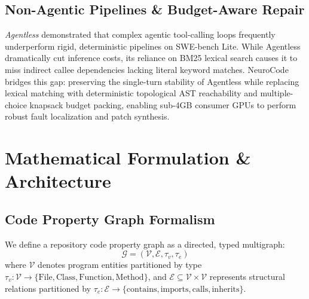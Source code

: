 \documentclass[conference]{IEEEtran}
\begin{document}
\subsection{Non-Agentic Pipelines \& Budget-Aware Repair}
\textit{Agentless} \cite{agentless} demonstrated that complex agentic tool-calling loops frequently underperform rigid, deterministic pipelines on SWE-bench Lite. While Agentless dramatically cut inference costs, its reliance on BM25 lexical search causes it to miss indirect callee dependencies lacking literal keyword matches. NeuroCode bridges this gap: preserving the single-turn stability of Agentless while replacing lexical matching with deterministic topological AST reachability and multiple-choice knapsack budget packing, enabling sub-4GB consumer GPUs to perform robust fault localization and patch synthesis.

\section{Mathematical Formulation \& Architecture}

\subsection{Code Property Graph Formalism}
We define a repository code property graph as a directed, typed multigraph:
\begin{equation}
\mathcal{G} = (\mathcal{V}, \mathcal{E}, \tau_v, \tau_e)
\end{equation}
where $\mathcal{V}$ denotes program entities partitioned by type $\tau_v: \mathcal{V} \to \{\text{File}, \text{Class}, \text{Function}, \text{Method}\}$, and $\mathcal{E} \subseteq \mathcal{V} \times \mathcal{V}$ represents structural relations partitioned by $\tau_e: \mathcal{E} \to \{\text{contains}, \text{imports}, \text{calls}, \text{inherits}\}$.
\end{document}

